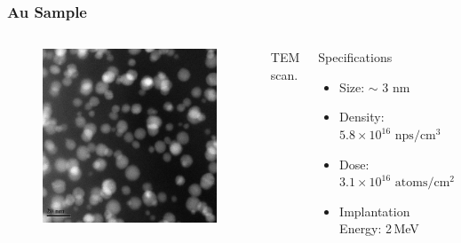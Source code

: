 \documentclass{beamer}
\begin{document}
\begin{frame}
\frametitle{Au Sample}
\begin{columns}
\begin{figure}
\centering
\includegraphics[width=\textwidth]{tem_au}
\end{figure}
\begin{center}
TEM scan.
\end{center}
\begin{block}{Specifications}
\begin{itemize}
\item Size: $\sim$ 3 nm
\item Density: $5.8\times 10^{16}\,\,\text{nps}/\text{cm}^{3}$
\item Dose: $3.1\times 10^{16}\,\,\text{atoms}/\text{cm}^{2}$
\item Implantation Energy: 2\,MeV
\end{itemize}
\end{block}
\end{columns}
\end{frame}
\end{document}
